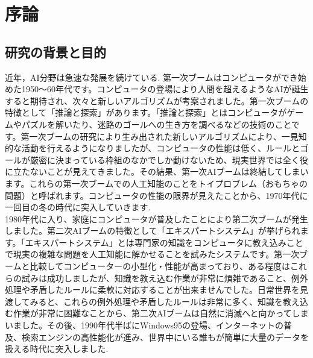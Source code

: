 \chapter{序論}
\section{研究の背景と目的}
近年，AI分野は急速な発展を続けている.
第一次ブームはコンピュータができ始めた1950～60年代です。コンピュータの登場により人間を超えるようなAIが誕生すると期待され、次々と新しいアルゴリズムが考案されました。第一次ブームの特徴として「推論と探索」があります。「推論と探索」とはコンピュータがゲームやパズルを解いたり、迷路のゴールへの生き方を調べるなどの技術のことです。第一次ブームの研究により生み出された新しいアルゴリズムにより、一見知的な活動を行えるようになりましたが、コンピュータの性能は低く、ルールとゴールが厳密に決まっている枠組のなかでしか動けないため、現実世界では全く役に立たないことが見えてきました。その結果、第一次AIブームは終結してしまいます。これらの第一次ブームでの人工知能のことをトイプロブレム（おもちゃの問題）と呼ばれます。コンピュータの性能の限界が見えたことから、1970年代に一回目の冬の時代に突入していきます.\\
1980年代に入り、家庭にコンピュータが普及したことにより第二次ブームが発生しました。第二次AIブームの特徴として「エキスパートシステム」が挙げられます。「エキスパートシステム」とは専門家の知識をコンピュータに教え込みことで現実の複雑な問題を人工知能に解かせることを試みたシステムです。第一次ブームと比較してコンピューターの小型化・性能が高まっており、ある程度はこれらの試みは成功しましたが、知識を教え込む作業が非常に煩雑であること、例外処理や矛盾したルールに柔軟に対応することが出来ませんでした。日常世界を見渡してみると、これらの例外処理や矛盾したルールは非常に多く、知識を教え込む作業が非常に困難なことから、第二次AIブームは自然に消滅へと向かってしまいました。その後、1990年代半ばにWindows95の登場、インターネットの普及、検索エンジンの高性能化が進み、世界中にいる誰もが簡単に大量のデータを扱える時代に突入しました.\\
